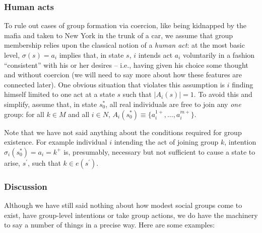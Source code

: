 \documentclass[
11pt,
titlepage,
reqno,
]{article}%
\theoremstyle{definition}
\begin{document}
	
	\subsubsection{Human acts\label{human acts}}
	To rule out cases of group formation via coercion, like being kidnapped by the mafia and taken to New York in the trunk of a car, we assume that group membership relies upon the classical notion of a \textit{human act}: at the most basic level, $\sigma( s)=a_i$ implies that, in state $ s$, $i$ intends act $a_i$ voluntarily in a fashion ``consistent'' with his or her desires -- i.e., having given his choice some thought and without coercion (we will need to say more about how these features are connected later). One obvious situation that violates this assumption is $i$ finding himself limited to one act at a state $ s$ such that $|A_i(s)|=1$. To avoid this and simplify, assume that, in state $s_0^\ast$, all real individuals are free to join any \textit{one} group: for all $k\in M$ and all $i\in N$, $A_i(s_0^\ast)\equiv \{a_i^{1+},\ldots,a_i^{m+}\}$.
	
	Note that we have not said anything about the conditions required for group existence. For example individual $i$ intending the act of joining  group $k$, intention $\sigma_i(s_0^\ast)=a_i=k^+$ is, presumably, necessary but not sufficient to cause a state to arise, $ s^\prime$, such that $k\in e(s^\prime)$. 
	
	
	
	\subsubsection{Discussion}
	
	Although we have still said nothing about how modest social groups come to exist, have group-level intentions or take group actions, we do have the machinery to say a number of things in a precise way. Here are some examples:
	
\end{document}
